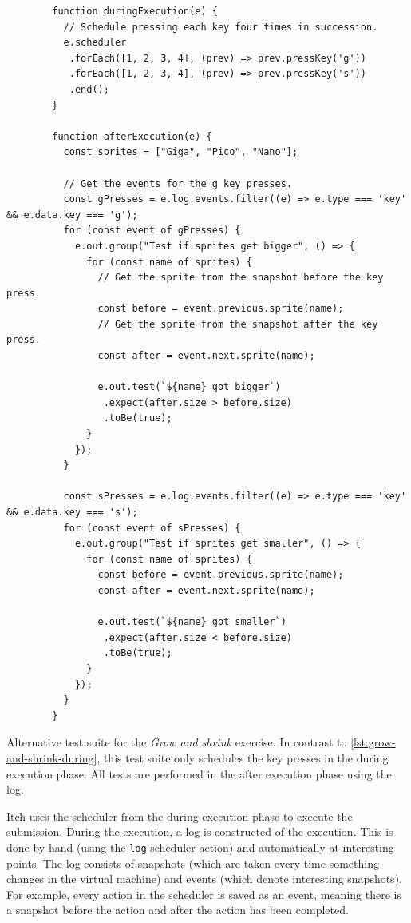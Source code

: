 \documentclass[../main]{subfiles}
\begin{document}
\begin{listing}
    \begin{verbatim}
        function duringExecution(e) {
          // Schedule pressing each key four times in succession.
          e.scheduler
           .forEach([1, 2, 3, 4], (prev) => prev.pressKey('g'))
           .forEach([1, 2, 3, 4], (prev) => prev.pressKey('s'))
           .end();
        }

        function afterExecution(e) {
          const sprites = ["Giga", "Pico", "Nano"];

          // Get the events for the g key presses.
          const gPresses = e.log.events.filter((e) => e.type === 'key' && e.data.key === 'g');
          for (const event of gPresses) {
            e.out.group("Test if sprites get bigger", () => {
              for (const name of sprites) {
                // Get the sprite from the snapshot before the key press.
                const before = event.previous.sprite(name);
                // Get the sprite from the snapshot after the key press.
                const after = event.next.sprite(name);

                e.out.test(`${name} got bigger`)
                 .expect(after.size > before.size)
                 .toBe(true);
              }
            });
          }

          const sPresses = e.log.events.filter((e) => e.type === 'key' && e.data.key === 's');
          for (const event of sPresses) {
            e.out.group("Test if sprites get smaller", () => {
              for (const name of sprites) {
                const before = event.previous.sprite(name);
                const after = event.next.sprite(name);

                e.out.test(`${name} got smaller`)
                 .expect(after.size < before.size)
                 .toBe(true);
              }
            });
          }
        }
    \end{verbatim}
    \caption{
        Alternative test suite for the \emph{Grow and shrink} exercise.
        In contrast to \cref{lst:grow-and-shrink-during}, this test suite only schedules the key presses in the during execution phase.
        All tests are performed in the after execution phase using the log.
    }
    \label{lst:grow-and-shrink-after}
\end{listing}

Itch uses the scheduler from the during execution phase to execute the submission.
During the execution, a log is constructed of the execution.
This is done by hand (using the \texttt{log} scheduler action) and automatically at interesting points.
The log consists of snapshots (which are taken every time something changes in the virtual machine) and events (which denote interesting snapshots).
For example, every action in the scheduler is saved as an event, meaning there is a snapshot before the action and after the action has been completed.
\end{document}
